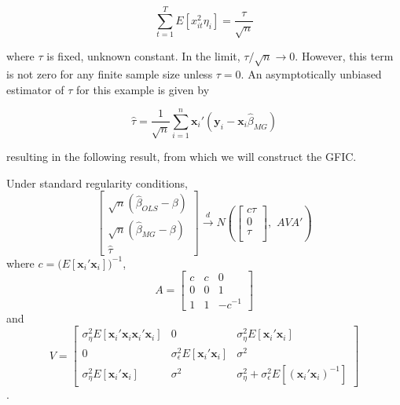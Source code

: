 \documentclass[12pt]{article}
\begin{document}
\begin{equation}
\sum_{t=1}^T E[x_{it}^2 \eta_i] = \frac{\tau}{\sqrt{n}}
\end{equation}

where $\tau$ is fixed, unknown constant. In the limit, $\tau/\sqrt{n} \rightarrow 0$. However, this term is not zero for any finite sample size unless $\tau =0$. An asymptotically unbiased estimator of $\tau$ for this example is given by

\begin{equation}
\widehat{\tau} = \frac{1}{\sqrt{n}} \sum_{i=1}^n \mathbf{x}_i' (\mathbf{y}_i - \mathbf{x}_i \widehat{\beta}_{MG})
\end{equation}

resulting in the following result, from which we will construct the GFIC. 

\begin{thm}
\label{thm:OLSvsMG}
  Under standard regularity conditions,
\[
  \left[\begin{array}{c}
\sqrt{n} (\widehat{\beta}_{OLS} - \beta)\\
\sqrt{n} (\widehat{\beta}_{MG} - \beta)\\
\widehat{\tau}
\end{array}\right] \overset{d}{\rightarrow} N \left( 
\left[\begin{array}{c}
c\tau \\
0  \\
\tau\\
\end{array}\right],  
\,\,A V A' \right)
\]
where $c = \big(E[\mathbf{x}_i' \mathbf{x}_i] \big)^{-1}$, 
\[
A = \left[\begin{array}{ccc}
c  & c& 0\\
0& 0 & 1\\
1 & 1 & -c^{-1}
\end{array}\right] \]
and
\[
V = \left[\begin{array}{ccc}
\sigma_\eta^2 E[\mathbf{x}_i'\mathbf{x}_i\mathbf{x}_i' \mathbf{x}_i]  & 0  & \sigma_\eta^2 E[\mathbf{x}_i' \mathbf{x}_i] \\
0 & \sigma_\epsilon^2 E[\mathbf{x}_i'\mathbf{x}_i] & \sigma^2\\ 
\sigma_\eta^2 E[\mathbf{x}_i'\mathbf{x}_i] & \sigma^2 & \sigma_\eta^2 + \sigma_\epsilon^2 E[(\mathbf{x}_i'\mathbf{x}_i)^{-1} ]
\end{array}\right] \].\\
\end{thm}
\end{document}
